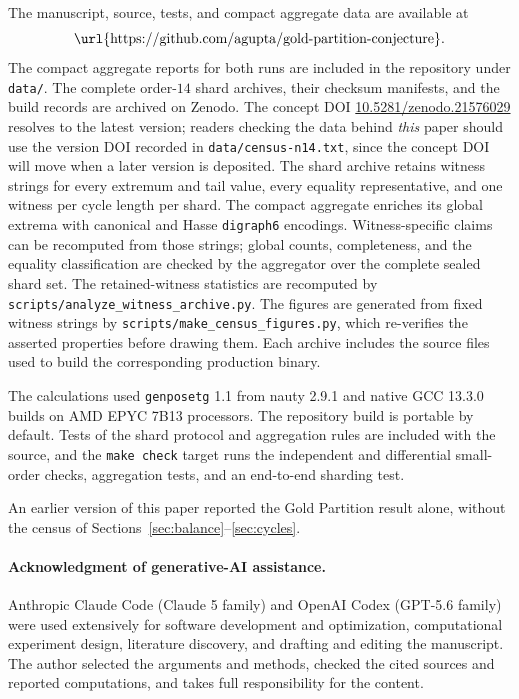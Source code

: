 \documentclass[11pt]{article}
\theoremstyle{definition}
\begin{document}
The manuscript, source, tests, and compact aggregate data are available at
\[
  \text{\url{https://github.com/agupta/gold-partition-conjecture}}.
\]
The compact aggregate reports for both runs are included in the repository
under \texttt{data/}.  The complete order-$14$ shard archives, their checksum
manifests, and the build records are archived on Zenodo.  The concept DOI
\href{https://doi.org/10.5281/zenodo.21576029}{10.5281/zenodo.21576029}
resolves to the latest version; readers checking the data behind \emph{this}
paper should use the version DOI recorded in \texttt{data/census-n14.txt},
since the concept DOI will move when a later version is deposited.
The shard archive retains witness strings for every extremum and tail value,
every equality representative, and one witness per cycle length per shard.
The compact aggregate enriches its global extrema with canonical and Hasse
\texttt{digraph6} encodings.  Witness-specific claims can be recomputed from
those strings; global counts, completeness, and the equality classification
are checked by the aggregator over the complete sealed shard set.  The
retained-witness statistics are recomputed by
\texttt{scripts/analyze\_witness\_archive.py}.  The figures are generated
from fixed witness strings by \texttt{scripts/make\_census\_figures.py},
which re-verifies the asserted properties before drawing them.  Each archive
includes the source files used to build the corresponding production binary.

The calculations used \texttt{genposetg} 1.1 from nauty 2.9.1 and native GCC
13.3.0 builds on AMD EPYC 7B13 processors.  The repository build is portable
by default.  Tests of the shard protocol and aggregation rules are included
with the source, and the \texttt{make check} target runs the independent and
differential small-order checks, aggregation tests, and an end-to-end sharding
test.

An earlier version of this paper reported the Gold Partition result alone,
without the census of Sections~\ref{sec:balance}--\ref{sec:cycles}.

\paragraph{Acknowledgment of generative-AI assistance.}
Anthropic Claude Code (Claude 5 family) and OpenAI Codex (GPT-5.6 family) were
used extensively for software development and optimization, computational
experiment design, literature discovery, and drafting and editing the
manuscript.  The author selected the arguments and methods, checked the cited
sources and reported computations, and takes full responsibility for the
content.
\end{document}
